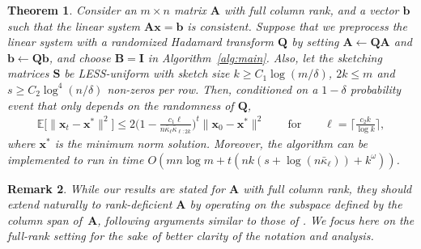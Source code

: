 \documentclass[11pt]{article}
\def\x{{\mathbf x}}
\def\b{{\mathbf b}}
\def\A{{\mathbf A}}
\def\B{{\mathbf B}}
\def\I{{\mathbf I}}
\def\Q{{\mathbf Q}}
\def\S{{\mathbf S}}
\def\E{{\mathds E}}
\newtheorem{thm}{Theorem}
\newtheorem{remark}[thm]{Remark}
\begin{document}
\begin{thm}\label{thm:main}
    Consider an $m\times n$ matrix $\A$ with full column rank, and a vector $\b$ such that the linear system $\A\x=\b$ is consistent. Suppose that we preprocess the linear system with a randomized Hadamard transform $\Q$ by setting $\A\leftarrow\Q\A$ and $\b\leftarrow \Q\b$, and choose $\B=\I$ in Algorithm~\ref{alg:main}. Also, let the sketching matrices $\S$ be LESS-uniform with sketch size $k\geq C_1\log(m/\delta)$, $2k \leq m$ and $s\geq C_2\log^4(n/\delta)$ non-zeros per row. Then, conditioned on a $1-\delta$ probability event that only depends on the randomness of $\Q$, 
    \begin{align*}
        \E\big[\|\x_t-\x^*\|^2\big]\leq 2\Big(1- \frac{c_1 \ell}{n\bar\kappa_{\ell}\bar\kappa_{\ell:2k}}\Big)^t\|\x_0-\x^*\|^2\qquad\text{for}\qquad \ell= \Big\lceil\frac {c_2k}{\log k}\Big\rceil,
    \end{align*}
    where $\x^*$ is the minimum norm solution.
    Moreover, the algorithm can be implemented to run in time $O(mn\log m + t(nk(s+\log(n\bar\kappa_\ell)) + k^\omega))$.
\end{thm}
\begin{remark}
    While our results are stated for $\A$ with full column rank, they should extend naturally to rank-deficient $\A$ by operating on the subspace defined by the column span of~$\A$, following arguments similar to those of \cite{gower2015stochastic}. We focus here on the full-rank setting for the sake of better clarity of the notation and analysis.
\end{remark}
\end{document}
